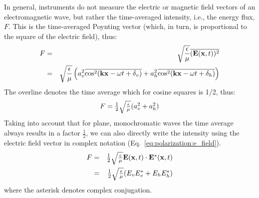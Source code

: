 In general, instruments do not measure the electric or magnetic field
vectors of an electromagnetic wave, but rather the time-averaged
intensity, i.e., the energy flux, $F$. This is the time-averaged Poynting
vector (which, in turn, is proportional to the square of the electric
field), thus:
\begin{eqnarray}
  F 
  &=& 
  \sqrt{\frac{\epsilon}{\mu}}\overline{(\mathbf{E}(\mathbf{x},t))^2}\\
   \nonumber
  &=&
  \sqrt{\frac{\epsilon}{\mu}}\left(
    a_v^2\overline{\cos^2(\mathbf{k}\mathbf{x} - \omega t + \delta_v)}
    + a_h^2\overline{\cos^2(\mathbf{k}\mathbf{x} - \omega t + \delta_h)}
   \right)
  \label{eq:polarization:intensity}
\end{eqnarray}
The overline denotes the time average
which for cosine squares is 1/2, thus:
\begin{equation}
  \label{eq:polarization:intensity}
 F = 
  \textstyle\frac{1}{2}\sqrt{\frac{\epsilon}{\mu}}(
    a_v^2 + a_h^2)  
\end{equation}
Taking into account that for plane, monochromatic waves 
the time average always results in a factor
$\frac{1}{2}$, we can also directly write the intensity using the
electric field vector in complex notation
(Eq.~\ref{eq:polarization:e_field}).
\begin{eqnarray}
  \label{eq:polarization:intensity_from_complex}
  F &=&  \textstyle\frac{1}{2}\sqrt{\frac{\epsilon}{\mu}} \mathbf{E} (\mathbf{x},t) 
          \cdot \mathbf{E}^\ast (\mathbf{x},t)\\ \nonumber
    &=&   \textstyle\frac{1}{2}\sqrt{\frac{\epsilon}{\mu}}
          (E_v E_v^\ast + E_h E_h^\ast)
\end{eqnarray}
where the asterisk denotes complex conjugation.%


